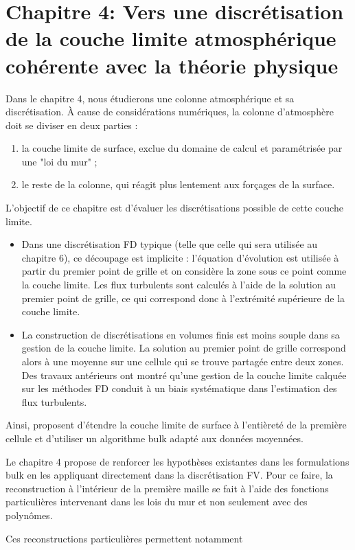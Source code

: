 \section*{Chapitre 4: Vers une discrétisation de la couche limite atmosphérique cohérente avec la théorie physique}
Dans le chapitre 4, nous étudierons une colonne atmosphérique et sa discrétisation.
À cause de considérations numériques, la colonne
d'atmosphère doit se diviser en deux parties :
\begin{enumerate}
	\item
	la couche limite de surface, exclue du domaine
	de calcul et paramétrisée par une "loi du mur" ;
	\item
	le reste de la colonne, qui réagit plus lentement
	aux forçages de la surface.
\end{enumerate}
L'objectif de ce chapitre est d'évaluer les discrétisations possible
de cette couche limite.
\begin{itemize}
	\item
Dans une discrétisation FD typique (telle que celle qui sera
utilisée au chapitre 6), ce découpage est implicite :
l'équation d'évolution est utilisée à partir
du premier point de grille et on considère la zone
sous ce point comme la couche limite.
Les flux turbulents sont calculés à l'aide de la solution
	au premier point de grille, ce qui correspond donc à
	l'extrémité supérieure de la couche limite.
\item La construction de discrétisations en volumes finis
	est moins souple dans sa gestion de la couche limite.
	La solution au premier point de grille correspond
	alors à une moyenne sur une cellule qui se trouve
	partagée entre deux zones.
	Des travaux antérieurs ont montré qu'une gestion
	de la couche limite calquée sur les méthodes FD
	conduit à un biais systématique dans l'estimation
	des flux turbulents.
\end{itemize}
Ainsi, \citep{nishizawa_surface_2018} proposent
d'étendre la couche limite de surface à l'entièreté de
la première cellule et d'utiliser un algorithme bulk
adapté aux données moyennées.
\par
Le chapitre 4 propose de renforcer les hypothèses
	existantes dans les formulations bulk en les
	appliquant directement dans la discrétisation FV.
	Pour ce faire, la reconstruction à l'intérieur
	de la première maille se fait à l'aide des fonctions
	particulières intervenant dans les lois du mur et
	non seulement avec des polynômes.
\par
Ces reconstructions particulières permettent notamment
